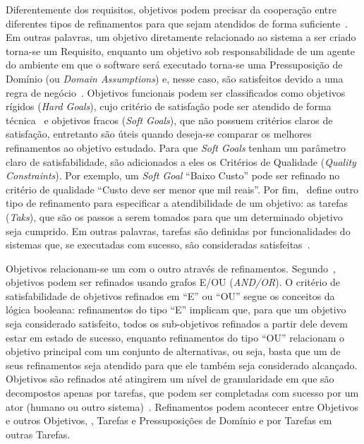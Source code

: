 Diferentemente dos requisitos, objetivos podem precisar da cooperação entre diferentes tipos de refinamentos para que sejam atendidos de forma suficiente~\cite{dardenne1993goal}. Em outras palavras, um objetivo diretamente relacionado ao sistema a ser criado torna-se um Requisito, enquanto um objetivo sob responsabilidade de um agente do ambiente em que o software será executado torna-se uma Pressuposição de Domínio (ou \textit{Domain Assumptions}) e, nesse caso, são satisfeitos devido a uma regra de negócio~\cite{van2001goal, van1998managing}. Objetivos funcionais podem ser classificados como objetivos rígidos (\textit{Hard Goals}), cujo critério de satisfação pode ser atendido de forma técnica~\cite{dardenne1993goal} e objetivos fracos (\textit{Soft Goals}), que não possuem critérios claros de satisfação, entretanto são úteis quando deseja-se comparar os melhores refinamentos ao objetivo estudado. Para que \textit{Soft Goals} tenham um parâmetro claro de satisfabilidade, são adicionados a eles os Critérios de Qualidade (\textit{Quality Constraints}). Por exemplo, um \textit{Soft Goal} ``Baixo Custo'' pode ser refinado no critério de qualidade ``Custo deve ser menor que mil reais''. Por fim,~\cite{jureta2008revisiting} define outro tipo de refinamento para especificar a atendibilidade de um objetivo: as tarefas (\textit{Taks}), que são os passos a serem tomados para que um determinado objetivo seja cumprido. Em outras palavras, tarefas são definidas por funcionalidades do sistemas que, se executadas com sucesso, são consideradas satisfeitas~\cite{souza2012requirement}.

Objetivos relacionam-se um com o outro através de refinamentos. Segundo~\cite{dardenne1991goal, dardenne1993goal}, objetivos podem ser refinados usando grafos E/OU (\textit{AND/OR}). O critério de satisfabilidade de objetivos refinados em ``E'' ou ``OU'' segue os conceitos da lógica booleana: refinamentos do tipo ``E'' implicam que, para que um objetivo seja considerado satisfeito, todos os sub-objetivos refinados a partir dele devem estar em estado de sucesso, enquanto refinamentos do tipo ``OU'' relacionam o objetivo principal com um conjunto de alternativas, ou seja, basta que um de seus refinamentos seja atendido para que ele também seja considerado alcançado. Objetivos são refinados até atingirem um nível de granularidade em que são decompostos apenas por tarefas, que podem ser completadas com sucesso por um ator (humano ou outro sistema)~\cite{souza2013awareness}. Refinamentos podem acontecer entre Objetivos e outros Objetivos, \sofgoals, Tarefas e Pressuposições de Domínio e por Tarefas em outras Tarefas.

